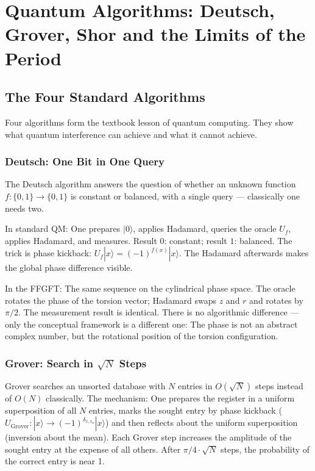 \chapter{Quantum Algorithms: Deutsch, Grover, Shor and the Limits of the Period}
\label{ch:algorithmen}

\section{The Four Standard Algorithms}

Four algorithms form the textbook lesson of quantum computing. They show
what quantum interference can achieve and what it cannot achieve.

\subsection*{Deutsch: One Bit in One Query}

The Deutsch algorithm answers the question of whether an unknown
function $f:\{0,1\}\to\{0,1\}$ is constant or balanced, with a single
query --- classically one needs two.

In standard QM: One prepares $|0\rangle$, applies Hadamard, queries the oracle $U_f$, applies Hadamard, and measures. Result $0$:
constant; result $1$: balanced. The trick is phase kickback:
$U_f|x\rangle = (-1)^{f(x)}|x\rangle$. The Hadamard afterwards makes the
global phase difference visible.

In the FFGFT: The same sequence on the cylindrical phase space. The
oracle rotates the phase of the torsion vector; Hadamard swaps $z$ and
$r$ and rotates by $\pi/2$. The measurement result is identical. There is no
algorithmic difference --- only the conceptual framework is a
different one: The phase is not an abstract complex number, but the
rotational position of the torsion configuration.

\subsection*{Grover: Search in $\sqrt N$ Steps}

Grover searches an unsorted database with $N$ entries in $O(\sqrt N)$
steps instead of $O(N)$ classically. The mechanism: One prepares the
register in a uniform superposition of all $N$ entries,
marks the sought entry by phase kickback
($U_\mathrm{Grover}:|x\rangle\to(-1)^{\delta_{x,x_0}}|x\rangle$) and
then reflects about the uniform superposition (inversion about
the mean). Each Grover step increases the amplitude of the sought
entry at the expense of all others. After $\pi/4\cdot\sqrt N$ steps,
the probability of the correct entry is near 1.

